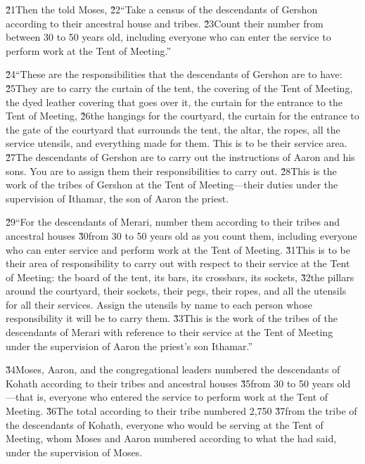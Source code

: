 \v{21}Then the  told Moses, \v{22}``Take a census of the descendants of Gershon according to their ancestral house and tribes. \v{23}Count their number from between 30 to 50 years old, including everyone who can enter the service to perform work at the Tent of Meeting.''

\v{24}``These are the responsibilities that the descendants of Gershon are to have: \v{25}They are to carry the curtain of the tent, the covering of the Tent of Meeting, the dyed leather covering that goes over it, the curtain for the entrance to the Tent of Meeting, \v{26}the hangings for the courtyard, the curtain for the entrance to the gate of the courtyard that surrounds the tent, the altar, the ropes, all the service utensils, and everything made for them. This is to be their service area. \v{27}The descendants of Gershon are to carry out the instructions of Aaron and his sons. You are to assign them their responsibilities to carry out. \v{28}This is the work of the tribes of Gershon at the Tent of Meeting---their duties under the supervision of Ithamar, the son of Aaron the priest.

\v{29}``For the descendants of Merari, number them according to their tribes and ancestral houses \v{30}from 30 to 50 years old as you count them, including everyone who can enter service and perform work at the Tent of Meeting. \v{31}This is to be their area of responsibility to carry out with respect to their service at the Tent of Meeting: the board of the tent, its bars, its crossbars, its sockets, \v{32}the pillars around the courtyard, their sockets, their pegs, their ropes, and all the utensils for all their services. Assign the utensils by name to each person whose responsibility it will be to carry them. \v{33}This is the work of the tribes of the descendants of Merari with reference to their service at the Tent of Meeting under the supervision of Aaron the priest's son Ithamar.''

\v{34}Moses, Aaron, and the congregational leaders numbered the descendants of Kohath according to their tribes and ancestral houses \v{35}from 30 to 50 years old---that is, everyone who entered the service to perform work at the Tent of Meeting. \v{36}The total according to their tribe numbered 2,750 \v{37}from the tribe of the descendants of Kohath, everyone who would be serving at the Tent of Meeting, whom Moses and Aaron numbered according to what the  had said, under the supervision of Moses.

